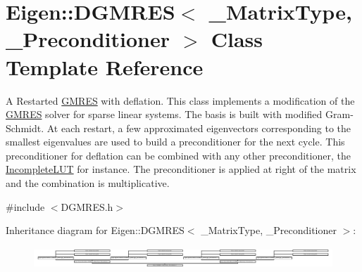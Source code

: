 \hypertarget{class_eigen_1_1_d_g_m_r_e_s}{}\section{Eigen\+:\+:D\+G\+M\+R\+ES$<$ \+\_\+\+Matrix\+Type, \+\_\+\+Preconditioner $>$ Class Template Reference}
\label{class_eigen_1_1_d_g_m_r_e_s}


A Restarted \hyperlink{group___iterative_linear_solvers___module_class_eigen_1_1_g_m_r_e_s}{G\+M\+R\+ES} with deflation. This class implements a modification of the \hyperlink{group___iterative_linear_solvers___module_class_eigen_1_1_g_m_r_e_s}{G\+M\+R\+ES} solver for sparse linear systems. The basis is built with modified Gram-\/\+Schmidt. At each restart, a few approximated eigenvectors corresponding to the smallest eigenvalues are used to build a preconditioner for the next cycle. This preconditioner for deflation can be combined with any other preconditioner, the \hyperlink{group___iterative_linear_solvers___module_class_eigen_1_1_incomplete_l_u_t}{Incomplete\+L\+UT} for instance. The preconditioner is applied at right of the matrix and the combination is multiplicative.  




{\ttfamily \#include $<$D\+G\+M\+R\+E\+S.\+h$>$}

Inheritance diagram for Eigen\+:\+:D\+G\+M\+R\+ES$<$ \+\_\+\+Matrix\+Type, \+\_\+\+Preconditioner $>$\+:\begin{figure}[H]
\begin{center}
\leavevmode
\includegraphics[height=0.799087cm]{class_eigen_1_1_d_g_m_r_e_s}
\end{center}
\end{figure}
